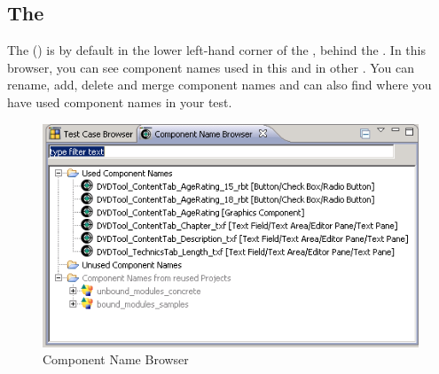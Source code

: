 \subsection{The \gdcompnamebrowser}

The \gdcompnamebrowser{} () is by default in the lower left-hand corner of the \specpersp{}, behind the \gdtestcasebrowser{}. In this browser, you can see component names used in this \gdproject{} and in other \gdprojects{}. You can rename, add, delete and merge component names and can also find where you have used component names in your test. 
 

\begin{figure}[h]
\begin{center}
\includegraphics{Userinterface/Editors/PS/compnamesbrowser}
\caption{Component Name Browser}
\label{compnamesbrowser}
\end{center}
\end{figure}
